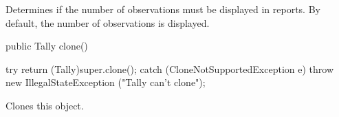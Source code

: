 \begin{tabb}
   Determines if the number of observations must be displayed in reports.
  By default, the number of observations is displayed.
\end{tabb}
\begin{htmlonly}
\end{htmlonly}
\begin{code}

   public Tally clone()\begin{hide} {
      try {
         return (Tally)super.clone();
      } catch (CloneNotSupportedException e) {
         throw new IllegalStateException ("Tally can't clone");
      }
   }\end{hide}
\end{code}
\begin{tabb} Clones this object.
\end{tabb}
\begin{code}\begin{hide}
}\end{hide}
\end{code}
